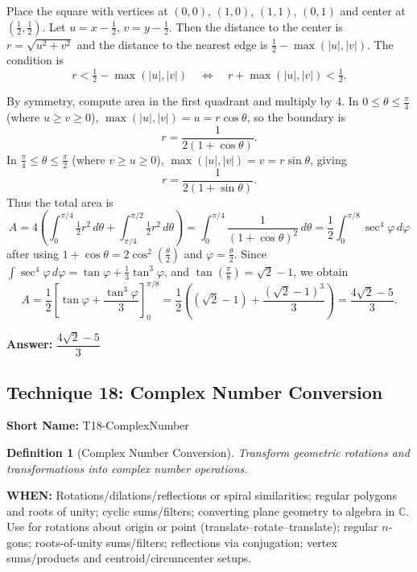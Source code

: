 \documentclass[12pt]{article}
\newtheorem{definition}{Definition}[section]
\newenvironment{solution}
{\begin{tcolorbox}[colback=green!5!white,colframe=green!75!black,title={Solution}]}{\end{tcolorbox}}
\begin{document}
\begin{solution}
Place the square with vertices at $(0,0)$, $(1,0)$, $(1,1)$, $(0,1)$ and center at $(\tfrac{1}{2}, \tfrac{1}{2})$. Let $u=x-\tfrac{1}{2}$, $v=y-\tfrac{1}{2}$. Then the distance to the center is $r=\sqrt{u^2+v^2}$ and the distance to the nearest edge is $\tfrac{1}{2}-\max(|u|,|v|)$. The condition is
\[
 r < \tfrac{1}{2} - \max(|u|,|v|) \quad \Longleftrightarrow \quad r + \max(|u|,|v|) < \tfrac{1}{2}.
\]

By symmetry, compute area in the first quadrant and multiply by 4. In $0\le \theta\le \tfrac{\pi}{4}$ (where $u\ge v\ge 0$), $\max(|u|,|v|)=u=r\cos\theta$, so the boundary is
\[
 r = \frac{1}{2(1+\cos\theta)}.
\]
In $\tfrac{\pi}{4}\le \theta\le \tfrac{\pi}{2}$ (where $v\ge u\ge 0$), $\max(|u|,|v|)=v=r\sin\theta$, giving
\[
 r = \frac{1}{2(1+\sin\theta)}.
\]
Thus the total area is
\[
 A 
 = 4\left( \int_{0}^{\pi/4} \tfrac{1}{2} r^2\,d\theta + \int_{\pi/4}^{\pi/2} \tfrac{1}{2} r^2\,d\theta \right)
 = \int_{0}^{\pi/4} \frac{1}{(1+\cos\theta)^2}\,d\theta
 = \frac{1}{2}\int_{0}^{\pi/8} \sec^4\varphi\,d\varphi
\]
after using $1+\cos\theta=2\cos^2(\tfrac{\theta}{2})$ and $\varphi=\tfrac{\theta}{2}$. Since $\int \sec^4\varphi\,d\varphi=\tan\varphi+\tfrac{1}{3}\tan^3\varphi$, and $\tan(\tfrac{\pi}{8})=\sqrt{2}-1$, we obtain
\[
 A = \frac{1}{2}\left[\tan\varphi+\frac{\tan^3\varphi}{3}\right]_{0}^{\pi/8}
 = \frac{1}{2}\left((\sqrt{2}-1) + \frac{(\sqrt{2}-1)^3}{3}\right)
 = \frac{4\sqrt{2}-5}{3}.
\]

\textbf{Answer:} $\dfrac{4\sqrt{2}-5}{3}$
\end{solution}

\subsection{Technique 18: Complex Number Conversion}
\textbf{Short Name:} T18-ComplexNumber

\begin{definition}[Complex Number Conversion]
Transform geometric rotations and transformations into complex number operations.
\end{definition}

\textbf{WHEN:} Rotations/dilations/reflections or spiral similarities; regular polygons and roots of unity; cyclic sums/filters; converting plane geometry to algebra in $\mathbb{C}$. Use for rotations about origin or point (translate--rotate--translate); regular $n$-gons; roots-of-unity sums/filters; reflections via conjugation; vertex sums/products and centroid/circumcenter setups.
\end{document}
